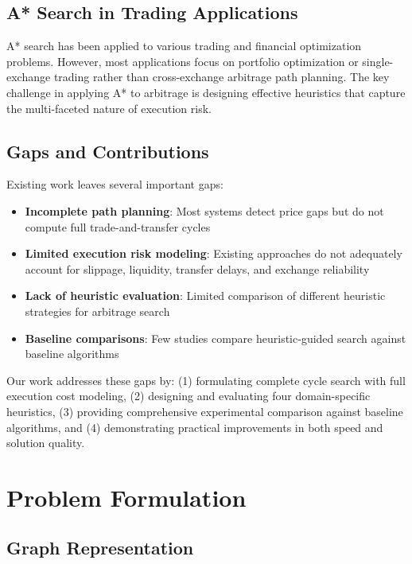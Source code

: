 \documentclass[11pt]{article}
\begin{document}
\subsection{A* Search in Trading Applications}

A* search has been applied to various trading and financial optimization problems. However, most applications focus on portfolio optimization or single-exchange trading rather than cross-exchange arbitrage path planning. The key challenge in applying A* to arbitrage is designing effective heuristics that capture the multi-faceted nature of execution risk.

\subsection{Gaps and Contributions}

Existing work leaves several important gaps:

\begin{itemize}
\item \textbf{Incomplete path planning}: Most systems detect price gaps but do not compute full trade-and-transfer cycles
\item \textbf{Limited execution risk modeling}: Existing approaches do not adequately account for slippage, liquidity, transfer delays, and exchange reliability
\item \textbf{Lack of heuristic evaluation}: Limited comparison of different heuristic strategies for arbitrage search
\item \textbf{Baseline comparisons}: Few studies compare heuristic-guided search against baseline algorithms
\end{itemize}

Our work addresses these gaps by: (1) formulating complete cycle search with full execution cost modeling, (2) designing and evaluating four domain-specific heuristics, (3) providing comprehensive experimental comparison against baseline algorithms, and (4) demonstrating practical improvements in both speed and solution quality.

\section{Problem Formulation}

\subsection{Graph Representation}
\end{document}
